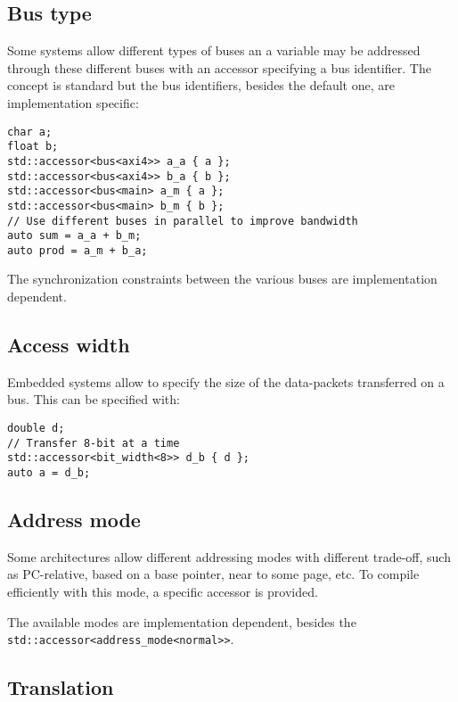\documentclass[a4paper]{article}
\begin{document}
\subsection{Bus type}
\label{sec:bus-type}

Some systems allow different types of buses an a variable may be
addressed through these different buses with an accessor specifying a
bus identifier. The concept is standard but the bus identifiers,
besides the default one, are implementation specific:
\begin{lstlisting}
char a;
float b;
std::accessor<bus<axi4>> a_a { a };
std::accessor<bus<axi4>> b_a { b };
std::accessor<bus<main> a_m { a };
std::accessor<bus<main> b_m { b };
// Use different buses in parallel to improve bandwidth
auto sum = a_a + b_m;
auto prod = a_m + b_a;
\end{lstlisting}

The synchronization constraints between the various buses are
implementation dependent.


\subsection{Access width}
\label{sec:access-width}

Embedded systems allow to specify the size of the data-packets
transferred on a bus. This can be specified with:
\begin{lstlisting}
double d;
// Transfer 8-bit at a time
std::accessor<bit_width<8>> d_b { d };
auto a = d_b;
\end{lstlisting}


\subsection{Address mode}
\label{sec:address-mode}

Some architectures allow different addressing modes with different
trade-off, such as PC-relative, based on a base pointer, near to some
page, etc. To compile efficiently with this mode, a specific accessor
is provided.

The available modes are implementation dependent, besides the
\lstinline|std::accessor<address_mode<normal>>|.




\subsection{Translation}
\label{sec:translation}
\end{document}
